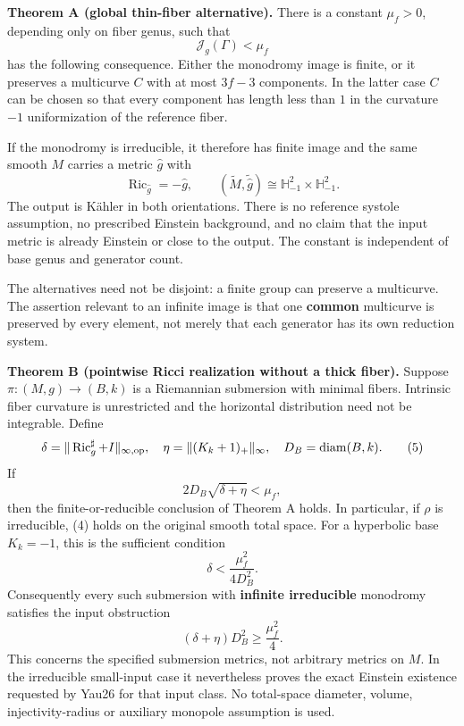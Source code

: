 \documentclass[
  11pt,
]{article}
\begin{document}
\textbf{Theorem A (global thin-fiber alternative).} There is a constant
\(\mu_f>0\), depending only on fiber genus, such that \[
                         \mathcal J_g(\Gamma)<\mu_f             \tag{3}
\] has the following consequence. Either the monodromy image is finite,
or it preserves a multicurve \(C\) with at most \(3f-3\) components. In
the latter case \(C\) can be chosen so that every component has length
less than \(1\) in the curvature \(-1\) uniformization of the reference
fiber.

If the monodromy is irreducible, it therefore has finite image and the
same smooth \(M\) carries a metric \(\widehat g\) with \[
 \operatorname{Ric}_{\widehat g}=-\widehat g,\qquad
 (\widetilde M,\widetilde{\widehat g})
     \cong\mathbb H^2_{-1}\times\mathbb H^2_{-1}.              \tag{4}
\] The output is Kähler in both orientations. There is no reference
systole assumption, no prescribed Einstein background, and no claim that
the input metric is already Einstein or close to the output. The
constant is independent of base genus and generator count.

The alternatives need not be disjoint: a finite group can preserve a
multicurve. The assertion relevant to an infinite image is that one
\textbf{common} multicurve is preserved by every element, not merely
that each generator has its own reduction system.

\textbf{Theorem B (pointwise Ricci realization without a thick fiber).}
Suppose \(\pi:(M,g)\to(B,k)\) is a Riemannian submersion with minimal
fibers. Intrinsic fiber curvature is unrestricted and the horizontal
distribution need not be integrable. Define \[
 \delta=\|\operatorname{Ric}_g^{\sharp}+I\|_{\infty,\rm op},
 \quad \eta=\|(K_k+1)_+\|_\infty,
 \quad D_B=\operatorname{diam}(B,k).
\tag{5}
\] If \[
                         2D_B\sqrt{\delta+\eta}<\mu_f,          \tag{6}
\] then the finite-or-reducible conclusion of Theorem A holds. In
particular, if \(\rho\) is irreducible, (4) holds on the original smooth
total space. For a hyperbolic base \(K_k=-1\), this is the sufficient
condition \[
                   \delta<\frac{\mu_f^2}{4D_B^2}.             \tag{7}
\] Consequently every such submersion with \textbf{infinite irreducible}
monodromy satisfies the input obstruction \[
                   (\delta+\eta)D_B^2\ge\frac{\mu_f^2}{4}.   \tag{8}
\] This concerns the specified submersion metrics, not arbitrary metrics
on \(M\). In the irreducible small-input case it nevertheless proves the
exact Einstein existence requested by Yau26 for that input class. No
total-space diameter, volume, injectivity-radius or auxiliary monopole
assumption is used.
\end{document}
